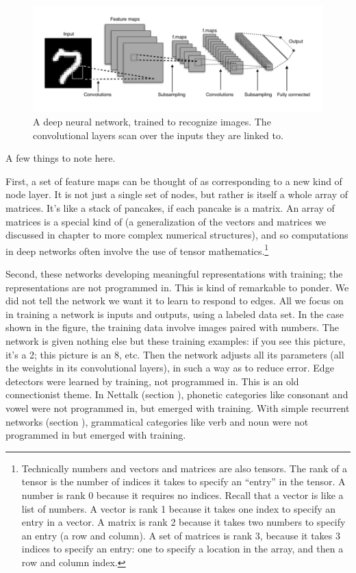 \begin{figure}[h]
\centering
\includegraphics[scale=.45]{./images/deepNet.png}
\caption[Adapted from a creative commons image by Aphex34 at \url{https://commons.wikimedia.org/wiki/File:Typical_cnn.png} ]{A deep neural network, trained to recognize images. The convolutional layers scan over the inputs they are linked to. }
\label{deep_net2}
\end{figure}

A few things to note here.

First, a set of feature maps can be thought of as corresponding to a new kind of node layer. It is not just a  single set of nodes, but rather is itself a whole array of matrices. It's like a stack of pancakes, if each pancake is a matrix.  An array of matrices is a special kind of  (a generalization of the vectors and matrices we discussed in chapter  to more complex numerical structures), and so computations in deep networks often involve the use of tensor mathematics.\footnote{Technically numbers and vectors and matrices are also tensors. The rank of a  tensor is the number of indices it takes to specify an ``entry'' in the tensor. A number is rank 0 because it requires no indices. Recall that a vector is like a list of numbers. A vector is rank 1 because it takes one index to specify an entry in a vector. A matrix is rank 2 because it takes two numbers to specify an entry (a row and column). A set of matrices is rank 3, because it takes 3 indices to specify an entry: one to specify a location in the array, and then a row and column index.}  

Second, these networks developing meaningful representations with training; the representations are not programmed in. This is kind of remarkable to ponder. We did not tell the network we want it to learn to respond to edges. All we focus on in training a network is inputs and outputs, using a labeled data set.  In the case shown in the figure, the training data involve images paired with numbers. The network is given nothing else but these training examples: if you see this picture, it's a 2; this picture is an 8, etc. Then the network adjusts all its parameters (all the weights in its convolutional layers), in such a way as to reduce error.  Edge detectors were learned by training, not programmed in. This is an old connectionist theme. In Nettalk (section ), phonetic categories like consonant and vowel were not programmed in, but emerged with training. With simple recurrent networks  (section ), grammatical categories like verb and noun were not programmed in but  emerged with training.

